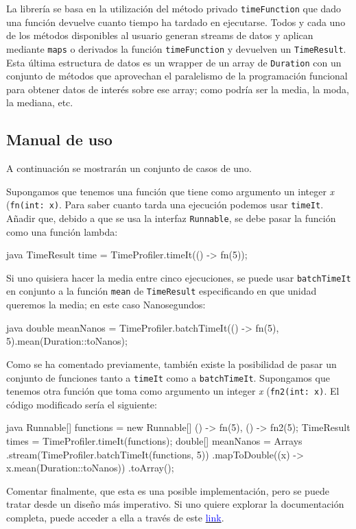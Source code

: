 La librería se basa en la utilización del método privado \texttt{timeFunction} que dado una función devuelve cuanto tiempo ha tardado en ejecutarse. Todos y cada uno de los métodos disponibles al usuario generan streams de datos y aplican mediante \texttt{maps} o derivados la función \texttt{timeFunction} y devuelven un \texttt{TimeResult}. Esta última estructura de datos es un wrapper de un array de \texttt{Duration} con un conjunto de métodos que aprovechan el paralelismo de la programación funcional para obtener datos de interés sobre ese array; como podría ser la media, la moda, la mediana, etc.

\subsection{Manual de uso}
A continuación se mostrarán un conjunto de casos de uno.\bigskip

Supongamos que tenemos una función que tiene como argumento un integer \textit{x} (\texttt{fn(int: x)}. Para saber cuanto tarda una ejecución podemos usar \texttt{timeIt}. Añadir que, debido a que se usa la interfaz \texttt{Runnable}, se debe pasar la función como una función lambda:

\begin{code}{\scriptsize}{java}
TimeResult time = TimeProfiler.timeIt(() -> fn(5));
\end{code}

Si uno quisiera hacer la media entre cinco ejecuciones, se puede usar \texttt{batchTimeIt} en conjunto a la función \texttt{mean} de \texttt{TimeResult} especificando en que unidad queremos la media; en este caso Nanosegundos:

\begin{code}{\scriptsize}{java}
double meanNanos = TimeProfiler.batchTimeIt(() -> fn(5), 5).mean(Duration::toNanos);
\end{code}

Como se ha comentado previamente, también existe la posibilidad de pasar un conjunto de funciones tanto a \texttt{timeIt} como a \texttt{batchTimeIt}. Supongamos que tenemos otra función que toma como argumento un integer \textit{x} (\texttt{fn2(int: x)}. El código modificado sería el siguiente:

\begin{code}{\scriptsize}{java}
Runnable[] functions = new Runnable[] {
    () -> fn(5), 
    () -> fn2(5)};
TimeResult times = TimeProfiler.timeIt(functions);
double[] meanNanos = Arrays
    .stream(TimeProfiler.batchTimeIt(functions, 5))
    .mapToDouble((x) -> x.mean(Duration::toNanos))
    .toArray();
\end{code}

Comentar finalmente, que esta es una posible implementación, pero se puede tratar desde un diseño más imperativo. Si uno quiere explorar la documentación completa, puede acceder a ella a través de este \href{https://zygmut.github.io/TimeProfiler}{\textcolor{blue}{link}}.